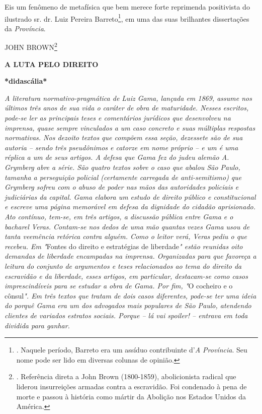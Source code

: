 Eis um fenômeno de metafísica que bem merece forte reprimenda
positivista do ilustrado sr. dr. Luiz Pereira Barreto\footnote{. Naquele
  período, Barreto era um assíduo contribuinte d'\emph{A Província}. Seu
  nome pode ser lido em diversas colunas de opinião.}, em uma das suas
brilhantes dissertações da \emph{Província}.

JOHN BROWN\footnote{. Referência direta a John Brown (1800-1859),
  abolicionista radical que liderou insurreições armadas contra a
  escravidão. Foi condenado à pena de morte e passou à história como
  mártir da Abolição nos Estados Unidos da América.}

\textbf{A LUTA PELO
DIREITO}

\textbf{*didascália*}

\emph{A literatura normativo-pragmática de Luiz Gama, lançada em 1869,
assume nos últimos três anos de sua vida o caráter de obra de
maturidade. Nesses escritos, pode-se ler as principais teses e
comentários jurídicos que desenvolveu na imprensa, quase sempre
vinculados a um caso concreto e suas múltiplas respostas normativas. Nos
dezoito textos que compõem essa seção, dezessete são de sua autoria --
sendo três pseudônimos e catorze em nome próprio -- e um é uma réplica a
um de seus artigos. A defesa que Gama fez do judeu alemão A. Grymberg
abre a série. São quatro textos sobre o caso que abalou São Paulo,
tamanha a perseguição policial (certamente carregada de anti-semitismo)
que Grymberg sofreu com o abuso de poder nas mãos das autoridades
policiais e judiciárias da capital. Gama elabora um estudo de direito
público e constitucional e escreve uma página memorável em defesa da
dignidade do cidadão aprisionado. Ato contínuo, tem-se, em três artigos,
a discussão pública entre Gama e o bacharel Veras. Contam-se nos dedos
de uma mão quantas vezes Gama usou de tanta veemência retórica contra
alguém. Como o leitor verá, Veras pediu o que recebeu. Em "}Fontes do
direito e estratégias de liberdade\emph{" estão reunidas oito demandas
de liberdade encampadas na imprensa. Organizadas para que favoreça a
leitura do conjunto de argumentos e teses relacionados ao tema do
direito da escravidão e da liberdade, esses artigos, em particular,
destacam-se como casos imprescindíveis para se estudar a obra de Gama.
Por fim, "}O cocheiro e o cônsul\emph{". Em três textos que tratam de
dois casos diferentes, pode-se ter uma ideia do porquê Gama era um dos
advogados mais populares de São Paulo, atendendo clientes de variados
estratos sociais. Porque -- lá vai spoiler! -- entrava em toda dividida
para ganhar.}

